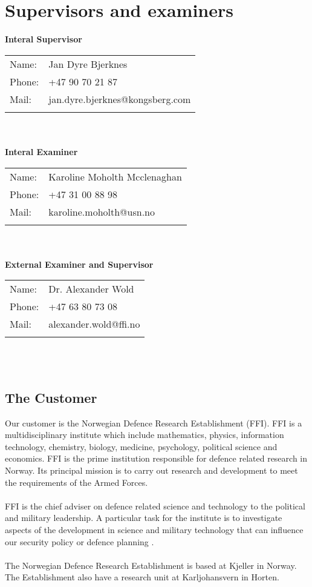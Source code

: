 \section{Supervisors and examiners}

\textbf{Interal Supervisor}\\
\begin{tabular}{ll}                                              
Name: 	            & Jan Dyre Bjerknes	         \\
Phone:		        & +47 90 70 21 87			     \\
Mail:	            & jan.dyre.bjerknes@kongsberg.com  \\\\      
\end{tabular}
\\\\
\textbf{Interal Examiner}\\
\begin{tabular}{ll}                                              
Name: 	            & Karoline Moholth Mcclenaghan   \\
Phone:		        & +47 31 00 88 98			     \\
Mail:	            & karoline.moholth@usn.no 	    \\\\      
\end{tabular}
\\\\
\textbf{External Examiner and Supervisor}\\
\begin{tabular}{ll}                                              
Name: 	            & Dr. Alexander Wold   \\
Phone:		        & +47 63 80 73 08			     \\
Mail:	            & alexander.wold@ffi.no 	    \\\\      
\end{tabular}
\\\

\subsection{The Customer}
Our customer is the  Norwegian  Defence  Research  Establishment (FFI). FFI is a multidisciplinary institute which include mathematics, physics, information technology, chemistry, biology, medicine, psychology, political science and economics. FFI is the prime institution responsible for defence related research in Norway. Its principal mission is to carry out research and development to meet the requirements of the Armed Forces.
\\\\
FFI is the chief adviser on defence related science and technology to the political and military leadership. A particular task for the institute is to investigate aspects of the development in science and military technology that can influence our security policy or defence planning \cite{FFI}.
\\\\
The  Norwegian  Defence  Research  Establishment is based at Kjeller in Norway. The Establishment also have a research unit at Karljohansvern in Horten. 
